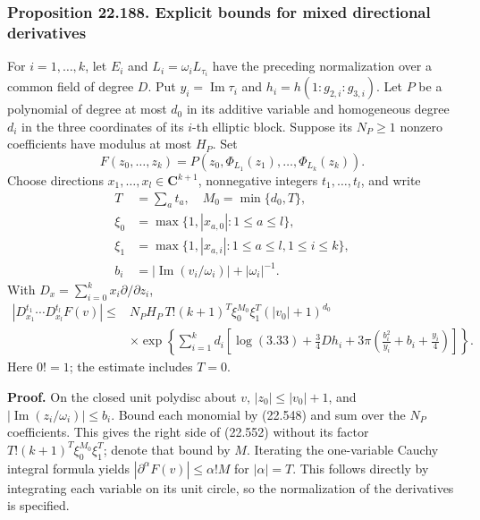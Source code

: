 \documentclass[
  11pt,
  a4paper,
]{article}
\begin{document}
\subsubsection{Proposition 22.188. Explicit bounds for mixed directional
derivatives}\label{proposition-22.188.-explicit-bounds-for-mixed-directional-derivatives}

For \(i=1,\ldots,k\), let \(E_i\) and \(L_i=\omega_iL_{\tau_i}\) have
the preceding normalization over a common field of degree \(D\). Put
\(y_i=\operatorname{Im}\tau_i\) and \(h_i=h(1:g_{2,i}:g_{3,i})\). Let
\(P\) be a polynomial of degree at most \(d_0\) in its additive variable
and homogeneous degree \(d_i\) in the three coordinates of its \(i\)-th
elliptic block. Suppose its \(N_P\ge1\) nonzero coefficients have
modulus at most \(H_P\). Set \[
 F(z_0,\ldots,z_k)=P(z_0,\Phi_{L_1}(z_1),\ldots,\Phi_{L_k}(z_k)).
 \tag{22.550}
\] Choose directions \(x_1,\ldots,x_l\in\mathbf C^{k+1}\), nonnegative
integers \(t_1,\ldots,t_l\), and write \[
 \begin{split}
 T&=\sum_at_a,\quad M_0=\min\{d_0,T\},\\
 \xi_0&=\max\{1,|x_{a,0}|:1\le a\le l\},\\
 \xi_1&=\max\{1,|x_{a,i}|:1\le a\le l,1\le i\le k\},\\
 b_i&=|\operatorname{Im}(v_i/\omega_i)|+|\omega_i|^{-1}.
 \end{split}
 \tag{22.551}
\] With \(D_x=\sum_{i=0}^kx_i\partial/\partial z_i\), \[
 \begin{split}
 |D_{x_1}^{t_1}\cdots D_{x_l}^{t_l}F(v)|
 \le{}&N_PH_P\,T!(k+1)^T\xi_0^{M_0}\xi_1^T
 (|v_0|+1)^{d_0}\\
 &\times\exp\left\{\sum_{i=1}^kd_i
 \left[\log(3.33)+\frac34Dh_i
       +3\pi\left(\frac{b_i^2}{y_i}+b_i+\frac{y_i}{4}\right)\right]\right\}.
 \end{split}
 \tag{22.552}
\] Here \(0!=1\); the estimate includes \(T=0\).

\textbf{Proof.} On the closed unit polydisc about \(v\),
\(|z_0|\le|v_0|+1\), and \(|\operatorname{Im}(z_i/\omega_i)|\le b_i\).
Bound each monomial by (22.548) and sum over the \(N_P\) coefficients.
This gives the right side of (22.552) without its factor
\(T!(k+1)^T\xi_0^{M_0}\xi_1^T\); denote that bound by \(M\). Iterating
the one-variable Cauchy integral formula yields
\(|\partial^\alpha F(v)|\le\alpha!M\) for \(|\alpha|=T\). This follows
directly by integrating each variable on its unit circle, so the
normalization of the derivatives is specified.
\end{document}
